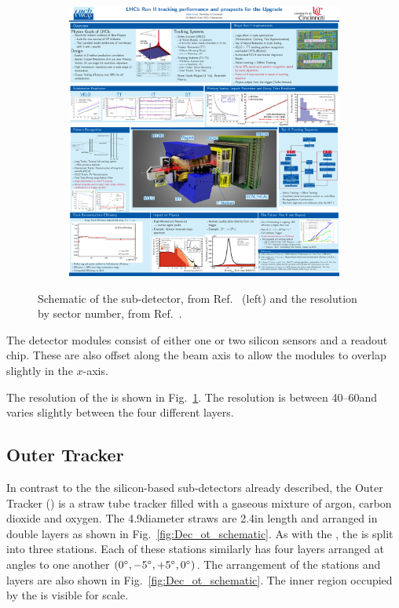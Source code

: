 \begin{figure}[!h]
\begin{subfigure}[m]{0.49\textwidth}
        \includegraphics[width=1.0\textwidth]{figs/Detector/it_resolution.pdf}
    \end{subfigure}
    \caption{Schematic of the \intr sub-detector, from Ref.~\cite{Alves:2008zz} (left) and the \intr resolution by sector number, from Ref.~\cite{LHCb-DP-2014-002}.}
    \label{fig:Dec_it_scematic}   
\end{figure}



The detector modules consist of either one or two silicon sensors and a readout chip. These are also offset along the beam axis to allow the modules to overlap slightly in the $x$-axis.

The resolution of the \intr is shown in Fig.~\ref{fig:Dec_it_scematic}. The resolution is between 40--60\mum and varies slightly between the four different layers.    



\subsection{Outer Tracker}

In contrast to the the silicon-based sub-detectors already described, the Outer Tracker (\ot) is a straw tube tracker filled with a gaseous mixture of argon, carbon dioxide and oxygen. The 4.9\mm diameter straws are 2.4\m in length and arranged in double layers as shown in Fig.~\ref{fig:Dec_ot_schematic}. As with the \intr, the \ot is split into three stations. Each of these stations similarly has four layers arranged at angles to one another $(0^{\circ},-5^{\circ},+5^{\circ},0^{\circ})$. The arrangement of the stations and layers are also shown in Fig.~\ref{fig:Dec_ot_schematic}. The inner region occupied by the \intr is visible for scale.

